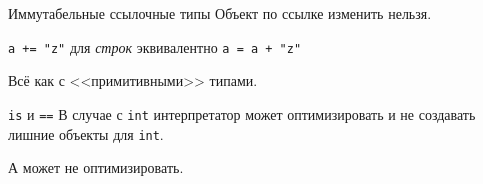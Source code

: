 \begin{frame}[t,fragile]{Иммутабельные ссылочные типы}
	Объект по ссылке изменить нельзя.
	
	\verb~a += "z"~ для \textit{строк} эквивалентно \verb~a = a + "z"~

	Всё как с <<примитивными>> типами.
\end{frame}

\begin{frame}[t]{\texttt{is} и \texttt{==}}
	В случае с \texttt{int} интерпретатор может оптимизировать и не создавать
	лишние объекты для \texttt{int}.
	
	А может не оптимизировать.
\end{frame}
